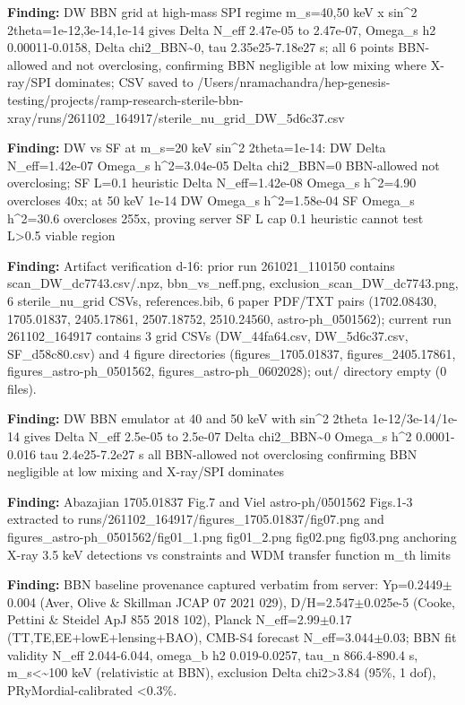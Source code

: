 \documentclass[11pt,a4paper]{article}
\begin{document}
\textbf{Finding:} DW BBN grid at high-mass SPI regime m\_s=40,50 keV x sin\textasciicircum{}2 2theta=1e-12,3e-14,1e-14 gives Delta N\_eff 2.47e-05 to 2.47e-07, Omega\_s h2 0.00011-0.0158, Delta chi2\_BBN\textasciitilde{}0, tau 2.35e25-7.18e27 s; all 6 points BBN-allowed and not overclosing, confirming BBN negligible at low mixing where X-ray/SPI dominates; CSV saved to /Users/nramachandra/hep-genesis-testing/projects/ramp-research-sterile-bbn-xray/runs/261102\_164917/sterile\_nu\_grid\_DW\_5d6c37.csv

\textbf{Finding:} DW vs SF at m\_s=20 keV sin\textasciicircum{}2 2theta=1e-14: DW Delta N\_eff=1.42e-07 Omega\_s h\textasciicircum{}2=3.04e-05 Delta chi2\_BBN=0 BBN-allowed not overclosing; SF L=0.1 heuristic Delta N\_eff=1.42e-08 Omega\_s h\textasciicircum{}2=4.90 overcloses 40x; at 50 keV 1e-14 DW Omega\_s h\textasciicircum{}2=1.58e-04 SF Omega\_s h\textasciicircum{}2=30.6 overcloses 255x, proving server SF L cap 0.1 heuristic cannot test L\textgreater{}0.5 viable region

\textbf{Finding:} Artifact verification d-16: prior run 261021\_110150 contains scan\_DW\_dc7743.csv/.npz, bbn\_vs\_neff.png, exclusion\_scan\_DW\_dc7743.png, 6 sterile\_nu\_grid CSVs, references.bib, 6 paper PDF/TXT pairs (1702.08430, 1705.01837, 2405.17861, 2507.18752, 2510.24560, astro-ph\_0501562); current run 261102\_164917 contains 3 grid CSVs (DW\_44fa64.csv, DW\_5d6c37.csv, SF\_d58c80.csv) and 4 figure directories (figures\_1705.01837, figures\_2405.17861, figures\_astro-ph\_0501562, figures\_astro-ph\_0602028); out/ directory empty (0 files).

\textbf{Finding:} DW BBN emulator at 40 and 50 keV with sin\textasciicircum{}2 2theta 1e-12/3e-14/1e-14 gives Delta N\_eff 2.5e-05 to 2.5e-07 Delta chi2\_BBN\textasciitilde{}0 Omega\_s h\textasciicircum{}2 0.0001-0.016 tau 2.4e25-7.2e27 s all BBN-allowed not overclosing confirming BBN negligible at low mixing and X-ray/SPI dominates

\textbf{Finding:} Abazajian 1705.01837 Fig.7 and Viel astro-ph/0501562 Figs.1-3 extracted to runs/261102\_164917/figures\_1705.01837/fig07.png and figures\_astro-ph\_0501562/fig01\_1.png fig01\_2.png fig02.png fig03.png anchoring X-ray 3.5 keV detections vs constraints and WDM transfer function m\_th limits

\textbf{Finding:} BBN baseline provenance captured verbatim from server: Yp=0.2449$\pm$0.004 (Aver, Olive \& Skillman JCAP 07 2021 029), D/H=2.547$\pm$0.025e-5 (Cooke, Pettini \& Steidel ApJ 855 2018 102), Planck N\_eff=2.99$\pm$0.17 (TT,TE,EE+lowE+lensing+BAO), CMB-S4 forecast N\_eff=3.044$\pm$0.03; BBN fit validity N\_eff 2.044-6.044, omega\_b h2 0.019-0.0257, tau\_n 866.4-890.4 s, m\_s\textless{}\textasciitilde{}100 keV (relativistic at BBN), exclusion Delta chi2\textgreater{}3.84 (95\%, 1 dof), PRyMordial-calibrated \textless{}0.3\%.
\end{document}
